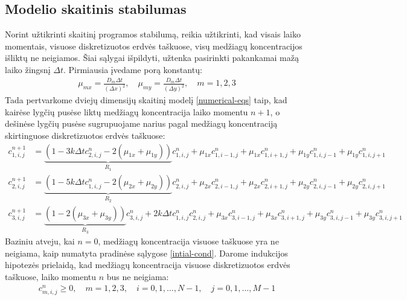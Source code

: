 \newpage
\subsection{Modelio skaitinis stabilumas}

Norint užtikrinti skaitinį programos stabilumą, reikia užtikrinti, kad visais laiko momentais, visuose diskretizuotos erdvės taškuose, visų medžiagų koncentracijos išliktų ne neigiamos. Šiai sąlygai išpildyti, užtenka pasirinkti pakankamai mažą laiko žingsnį $\Delta t$. Pirmiausia įvedame porą konstantų:
\begin{align*}
\mu_{mx} = \frac{D_m\Delta t}{(\Delta x)^2}, \quad
\mu_{my} = \frac{D_m\Delta t}{(\Delta y)^2}, \quad m = 1, 2, 3
\end{align*}
Tada pertvarkome dviejų dimensijų skaitinį modelį \eqref{numerical-eqs} taip, kad kairėse lygčių pusėse liktų medžiagų koncentracija laiko momentu $n+1$, o dešinėse lygčių pusėse sugrupuojame narius pagal medžiagų koncentraciją skirtinguose diskretizuotos erdvės taškuose:
\begin{subequations} \label{eqs:r-coefs}
  \begin{align}
  c^{n+1}_{1,i,j}&=
  \underbrace{(1-3k\Delta tc^{n}_{2,i,j}-2(\mu_{1x}+\mu_{1y}))}_{R_1}c^n_{1,i,j}
  +\mu_{1x}c^n_{1,i-1,j}+\mu_{1x}c^n_{1,i+1,j}+\mu_{1y}c^n_{1,i,j-1}+\mu_{1y}c^n_{1,i,j+1} \label{r-coefs1}\\
  c^{n+1}_{2,i,j}&=
  \underbrace{(1-5k\Delta tc^{n}_{1,i,j}-2(\mu_{2x}+\mu_{2y}))}_{R_2}c^n_{2,i,j}
  +\mu_{2x}c^n_{2,i-1,j}+\mu_{2x}c^n_{2,i+1,j}+\mu_{2y}c^n_{2,i,j-1}+\mu_{2y}c^n_{2,i,j+1} \label{r-coefs2}\\
  c^{n+1}_{3,i,j}&=
  \underbrace{(1-2(\mu_{3x} + \mu_{3y}))}_{R_3}c^n_{3,i,j}+2k\Delta tc^{n}_{1,i,j}c^{n}_{2,i,j} 
  +\mu_{3x}c^n_{3,i-1,j}+\mu_{3x}c^n_{3,i+1,j}
  +\mu_{3y}c^n_{3,i,j-1}+\mu_{3y}c^n_{3,i,j+1}
  \label{r-coefs3}
  \end{align}
\end{subequations}
Baziniu atveju, kai $n=0$, medžiagų koncentracija visuose taškuose yra ne neigiama, kaip numatyta pradinėse sąlygose \eqref{intial-cond}. Darome indukcijos hipotezės prielaidą, kad medžiagų koncentracija visuose diskretizuotos erdvės taškuose, laiko momentu $n$ bus ne neigiama:
\begin{align} \label{induction-assumption}
  c^n_{m,i,j} \geqslant 0, \quad m=1,2,3,\quad i=0,1,\dots,N-1,\quad j=0,1,\dots,M-1
\end{align}
